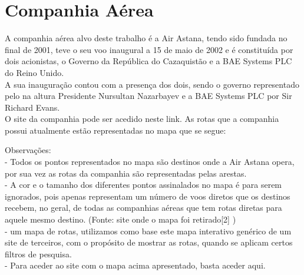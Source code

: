 \chapter{Companhia Aérea}
\label{chapter:Companhia Aérea}
A companhia aérea alvo deste trabalho é a Air Astana, tendo sido fundada no final de 2001, teve o seu voo 
inaugural a 15 de maio de 2002 e é constituída por dois acionistas, o Governo da República do Cazaquistão e a 
BAE Systems PLC do Reino Unido.\\
A sua inauguração contou com a presença dos dois, sendo o governo 
representado pelo na altura Presidente Nursultan Nazarbayev e a BAE Systems PLC por Sir Richard Evans.\\
O site da companhia pode ser acedido neste link.
As rotas que a companhia possui atualmente estão representadas no mapa que se segue:


Observações:\\
- Todos os pontos representados no mapa são destinos onde a Air Astana opera, por sua vez as rotas da 
companhia são representadas pelas arestas.\\
- A cor e o tamanho dos diferentes pontos assinalados no mapa é para serem ignorados, pois apenas 
representam um número de voos diretos que os destinos recebem, no geral, de todas as companhias aéreas 
que tem rotas diretas para aquele mesmo destino. (Fonte: site onde o mapa foi retirado[2]
)\\
- um mapa de rotas, utilizamos como base este mapa interativo genérico de um site de terceiros, com o 
propósito de mostrar as rotas, quando se aplicam certos filtros de pesquisa.\\
- Para aceder ao site com o mapa acima apresentado, basta aceder aqui.\\
